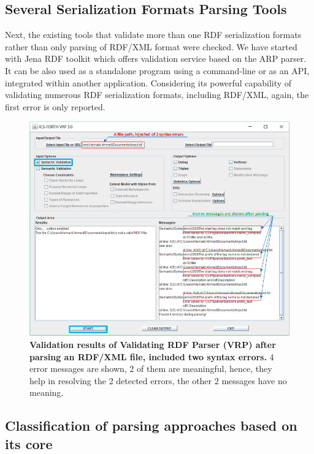 \subsection{Several Serialization Formats  Parsing Tools}

\par Next, the existing tools that validate more than one  RDF serialization formats rather than only parsing of RDF/XML format were checked. We have started with Jena RDF toolkit \cite{McBride:2002:JSW:613357.613755} which offers validation service based on the ARP parser. It can  be also used as a standalone program using a command-line  or as an API, integrated within another application. Considering its powerful capability of validating numerous RDF serialization formats, including RDF/XML, again, the first error is only reported.
 \begin{figure}[ht]
		\begin{center}
			\setlength\belowcaptionskip{-10mm}
			\includegraphics[scale=0.7,angle=0]{images/VRPErrorResult.png}
			\caption{\textbf{Validation results of Validating RDF Parser (VRP) \cite{karsten:Thesis:2000} after parsing an RDF/XML file, included two syntax errors.} 4 error messages are shown, 2 of them are meaningful, hence, they help in resolving the 2 detected errors, the other 2 messages have no meaning.}
			\label{Fig:VRPErrorResult}
		\end{center}
	\end{figure}
\subsection{Classification of parsing approaches based on its core}

